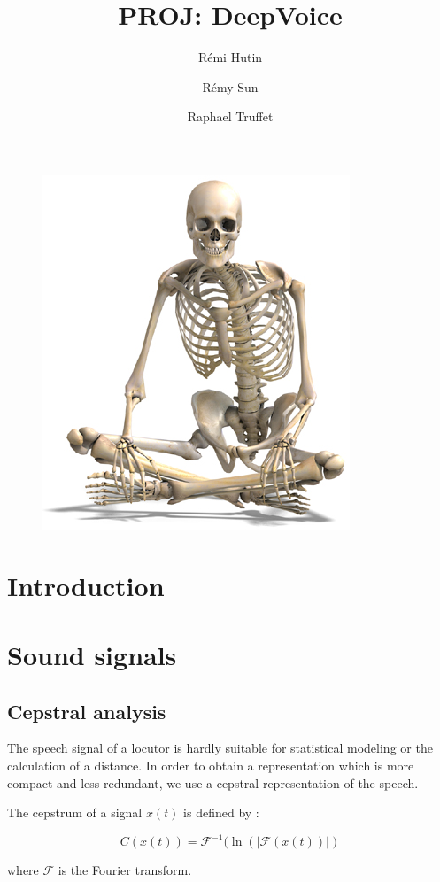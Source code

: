 \documentclass[conference]{IEEEtran}
\title{PROJ: DeepVoice}
\author{Rémi Hutin \and Rémy Sun \and Raphael Truffet}
\begin{document}
\maketitle


\begin{figure}[!h]
    \centering
    \includegraphics[scale=2]{squelette.jpg}
\end{figure}

\section{Introduction}

\section{Sound signals}

\subsection{Cepstral analysis}

The speech signal of a locutor is hardly suitable for statistical modeling or the calculation of a distance.
In order to obtain a representation which is more compact and less redundant, we use a cepstral representation of the speech.

The cepstrum of a signal $x(t)$ is defined by :

$$C(x(t)) = \mathcal{F}^{-1}(\ln(|\mathcal{F}(x(t))|)$$

where $\mathcal{F}$ is the Fourier transform.
\end{document}
